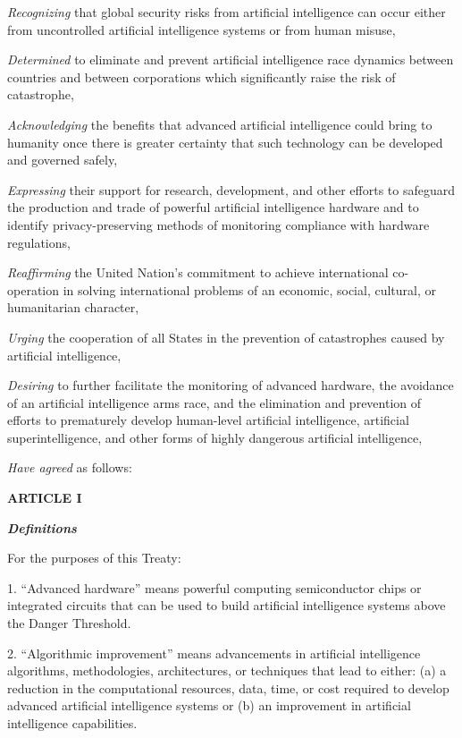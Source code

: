 \documentclass[12pt,a4paper]{article}
\begin{document}
\textit{Recognizing} that global security risks from artificial intelligence can occur either from uncontrolled artificial intelligence systems or from human misuse,

\textit{Determined} to eliminate and prevent artificial intelligence race dynamics between countries and between corporations which significantly raise the risk of catastrophe,

\textit{Acknowledging} the benefits that advanced artificial intelligence could bring to humanity once there is greater certainty that such technology can be developed and governed safely,

\textit{Expressing} their support for research, development, and other efforts to safeguard the production and trade of powerful artificial intelligence hardware and to identify privacy-preserving methods of monitoring compliance with hardware regulations, 

\textit{Reaffirming} the United Nation’s commitment to achieve international co-operation in solving international problems of an economic, social, cultural, or humanitarian character,

\textit{Urging} the cooperation of all States in the prevention of catastrophes caused by artificial intelligence,

\textit{Desiring} to further facilitate the monitoring of advanced hardware, the avoidance of an artificial intelligence arms race, and the elimination and prevention of efforts to prematurely develop human-level artificial intelligence, artificial superintelligence, and other forms of highly dangerous artificial intelligence, 

\textit{Have agreed} as follows:

\begin{center}
    
\textbf{{ARTICLE I}}

\textit{\textbf{Definitions}}
\end{center}

For the purposes of this Treaty:

1. “Advanced hardware” means powerful computing semiconductor chips or integrated circuits that can be used to build artificial intelligence systems above the Danger Threshold. 

2. “Algorithmic improvement” means advancements in artificial intelligence algorithms, methodologies, architectures, or techniques that lead to either: (a) a reduction in the computational resources, data, time, or cost required to develop advanced artificial intelligence systems or (b) an improvement in artificial intelligence capabilities.
\end{document}
